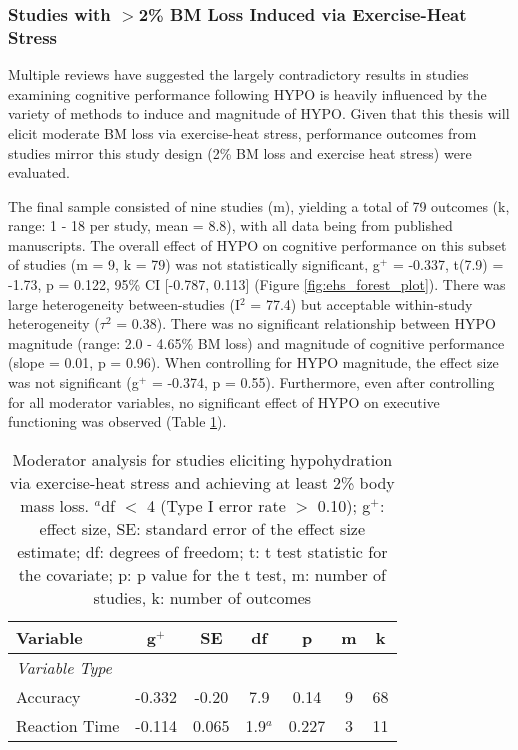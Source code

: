 \subsubsection{Studies with ${>}$2\% BM Loss Induced via Exercise-Heat Stress}
Multiple reviews \cite{lieberman_hydration_2007,lieberman_methods_2012} have suggested the largely contradictory results in studies examining cognitive performance following HYPO is heavily influenced by the variety of methods to induce and magnitude of HYPO. Given that this thesis will elicit moderate BM loss via exercise-heat stress, performance outcomes from studies mirror this study design (2\% BM loss and exercise heat stress) were evaluated.

The final sample consisted of nine studies (m), yielding a total of 79 outcomes (k, range: 1 - 18 per study, mean = 8.8), with all data being from published manuscripts. The overall effect of HYPO on cognitive performance on this subset of studies (m = 9, k = 79) was not statistically significant, g${^+}$ =  -0.337, t(7.9) = -1.73, p = 0.122, 95\% CI [-0.787, 0.113] (Figure \ref{fig:ehs_forest_plot}). There was large heterogeneity between-studies (I${^2}$ = 77.4) but acceptable within-study heterogeneity (${\tau}$${^2}$ = 0.38). There was no significant relationship between HYPO magnitude (range: 2.0 - 4.65\% BM loss) and magnitude of cognitive performance (slope = 0.01, p = 0.96). When controlling for HYPO magnitude, the effect size was not significant (g${^+}$ =  -0.374, p = 0.55). Furthermore, even after controlling for all moderator variables, no significant effect of HYPO on executive functioning was observed (Table \ref{tbl:ehs_2_moderators}). 

\begin{table}
	\caption{Moderator analysis for studies eliciting hypohydration via exercise-heat stress and achieving at least 2\% body mass loss. ${^a}$df ${<}$ 4 (Type I error rate ${>}$ 0.10); g${^+}$: effect size, SE: standard error of the effect size estimate; df: degrees of freedom; t: t test statistic for the covariate; p: p value for the t test, m: number of studies, k: number of outcomes}
	\centering
	\begin{tabular}{lcccccc} 
		\hline
		\textbf{Variable} & \textbf{g${^+}$} & \textbf{SE} & \textbf{df} & \textbf{p} & \textbf{m} & 
		\textbf{k} \\
		\hline
		\textit{Variable Type} &&&&&& \\
		Accuracy & -0.332 & -0.20 & 7.9 & 0.14 & 9 & 68 \\
		Reaction Time & -0.114 & 0.065 & 1.9${^a}$ & 0.227 & 3 & 11 \\
		\hline		    
	\end{tabular}
	\label{tbl:ehs_2_moderators}
\end{table}


